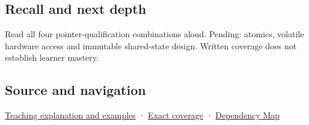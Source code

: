 \subsection{Recall and next depth}\label{appendix-c25d60fed375-recall-and-next-depth}

Read all four pointer-qualification combinations aloud. Pending: atomics, volatile hardware access and immutable shared-state design. Written coverage does not establish learner mastery.

\subsection{Source and navigation}\label{appendix-c25d60fed375-source-and-navigation}

\hyperref[01-foundations-i-ch003-read-only-is-a-path-not-an-ownership-or-synchronization-promise]{Teaching explanation and examples} · \hyperref[appendix-fd090d982a15-m008---parts-113-126]{Exact coverage} · \hyperref[appendix-4ad47bdd269a]{Dependency Map}
